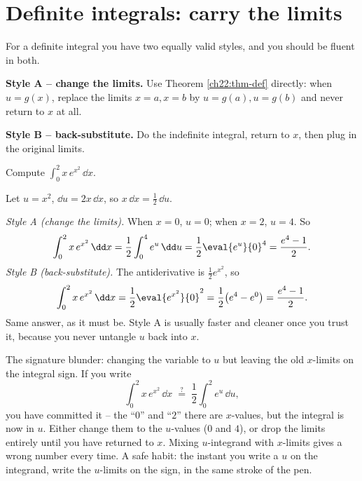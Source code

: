 \section{Definite integrals: carry the limits}
\label{ch22:definite}

For a definite integral you have two equally valid styles, and you should be fluent
in both.

\textbf{Style A -- change the limits.} Use Theorem \ref{ch22:thm-def} directly:
when $u = g(x)$, replace the limits $x=a, x=b$ by $u=g(a), u=g(b)$ and never return
to $x$ at all.

\textbf{Style B -- back-substitute.} Do the indefinite integral, return to $x$,
then plug in the original limits.

\begin{example}
\label{ch22:ex-bothways}
Compute $\displaystyle \int_0^2 x\,e^{x^2}\,\dd x$.

Let $u = x^2$, $\dd u = 2x\,\dd x$, so $x\,\dd x = \tfrac12\,\dd u$.

\emph{Style A (change the limits).} When $x=0$, $u=0$; when $x=2$, $u=4$. So
\[
  \int_0^2 x\,e^{x^2}\,\dd x = \frac12\int_{0}^{4} e^u\,\dd u
   = \frac12\eval{e^u}{0}^{4} = \frac{e^4-1}{2}.
\]
\emph{Style B (back-substitute).} The antiderivative is $\tfrac12 e^{x^2}$, so
\[
  \int_0^2 x\,e^{x^2}\,\dd x = \frac12\eval{e^{x^2}}{0}^{2}
   = \frac12\big(e^4 - e^0\big) = \frac{e^4-1}{2}.
\]
Same answer, as it must be. Style A is usually faster and cleaner once you trust it,
because you never untangle $u$ back into $x$.
\end{example}

\begin{trapbox}
The signature blunder: changing the variable to $u$ but leaving the old $x$-limits
on the integral sign. If you write
\[
  \int_0^2 x\,e^{x^2}\,\dd x \;\overset{?}{=}\; \frac12\int_0^2 e^u\,\dd u,
\]
you have committed it -- the ``$0$'' and ``$2$'' there are $x$-values, but the
integral is now in $u$. Either change them to the $u$-values ($0$ and $4$), or drop
the limits entirely until you have returned to $x$. Mixing $u$-integrand with
$x$-limits gives a wrong number every time. A safe habit: the instant you write a
$u$ on the integrand, write the $u$-limits on the sign, in the same stroke of the
pen.
\end{trapbox}

